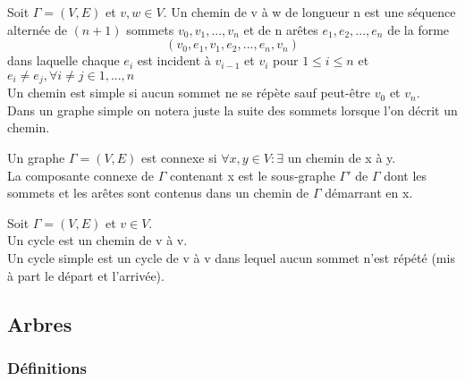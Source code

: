 \begin{defn}
Soit $\Gamma = (V,E)$ et $v,w \in V$. Un chemin de v à w de longueur n est une séquence alternée de $(n+1)$ sommets $v_{0},v_{1},...,v_{n}$ et de n arêtes $e_{1},e_{2},...,e_{n}$ de la forme $$ (v_{0},e_{1},v_{1},e_{2},...,e_{n},v_{n})$$ dans laquelle chaque $e_{i}$ est incident à $v_{i-1}$ et $v_{i}$ pour $1 \leq i \leq n$ et $ e_{i} \neq e_{j} , \forall i \neq j \in 1,...,n$ \\

Un chemin est simple si aucun sommet ne se répète sauf peut-être $v_{0}$ et $v_{n}$. \\

Dans un graphe simple on notera juste la suite des sommets lorsque l'on décrit un chemin. \\

\end{defn}

\begin{defn}
Un graphe $\Gamma = (V,E)$ est connexe si $\forall x,y \in V : \exists $ un chemin de x à y. \\

La composante connexe de $\Gamma$ contenant x est le sous-graphe ${\Gamma}'$ de $\Gamma$ dont les sommets et les arêtes sont contenus dans un chemin de $\Gamma$ démarrant en x. \\
\end{defn}

\begin{defn}
Soit $\Gamma = (V,E)$ et $v \in V$.\\

Un cycle est un chemin de v à v.\\

Un cycle simple est un cycle de v à v dans lequel aucun sommet n'est répété (mis à part le départ et l'arrivée).\\
\end{defn}

\newpage


\subsection{Arbres}

\subsubsection{Définitions}

